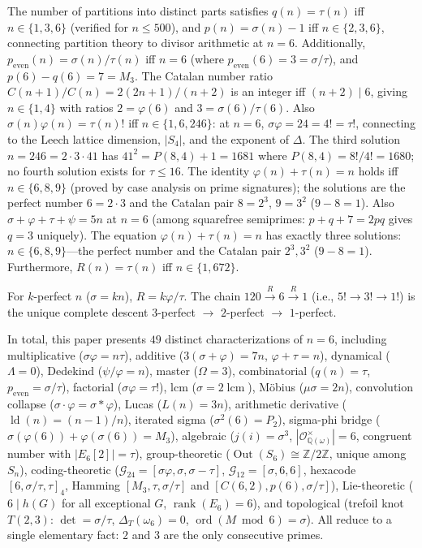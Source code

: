 \documentclass[11pt]{amsart}
\theoremstyle{remark}
\begin{document}
The number of partitions into distinct parts satisfies
$q(n) = \tau(n)$ iff $n \in \{1,3,6\}$ (verified for $n \leq 500$),
and $p(n) = \sigma(n) - 1$ iff $n \in \{2,3,6\}$,
connecting partition theory to divisor arithmetic at $n=6$.
Additionally, $p_{\text{even}}(n) = \sigma(n)/\tau(n)$ iff $n = 6$
(where $p_{\text{even}}(6) = 3 = \sigma/\tau$),
and $p(6) - q(6) = 7 = M_3$.
The Catalan number ratio $C(n+1)/C(n) = 2(2n+1)/(n+2)$
is an integer iff $(n+2) \mid 6$, giving $n \in \{1,4\}$
with ratios $2 = \varphi(6)$ and $3 = \sigma(6)/\tau(6)$.
Also $\sigma(n)\varphi(n) = \tau(n)!$ iff $n \in \{1, 6, 246\}$:
at $n=6$, $\sigma\varphi = 24 = 4! = \tau!$, connecting to the
Leech lattice dimension, $|S_4|$, and the exponent of $\Delta$.
The third solution $n = 246 = 2 \cdot 3 \cdot 41$
has $41^2 = P(8,4) + 1 = 1681$ where $P(8,4) = 8!/4! = 1680$;
no fourth solution exists for $\tau \leq 16$.
The identity $\varphi(n) + \tau(n) = n$ holds iff $n \in \{6, 8, 9\}$
(proved by case analysis on prime signatures);
the solutions are the perfect number $6 = 2 \cdot 3$ and
the Catalan pair $8 = 2^3$, $9 = 3^2$ ($9 - 8 = 1$).
Also $\sigma + \varphi + \tau + \psi = 5n$ at $n = 6$
(among squarefree semiprimes: $p + q + 7 = 2pq$ gives
$q = 3$ uniquely).
The equation $\varphi(n) + \tau(n) = n$ has exactly three solutions:
$n \in \{6, 8, 9\}$---the perfect number and the Catalan pair
$2^3, 3^2$ ($9 - 8 = 1$).
Furthermore, $R(n) = \tau(n)$ iff $n \in \{1, 672\}$.

For $k$-perfect $n$ ($\sigma = kn$), $R = k\varphi/\tau$.
The chain $120 \xrightarrow{R} 6 \xrightarrow{R} 1$
(i.e., $5! \to 3! \to 1!$) is the unique complete descent
$3$-perfect $\to$ $2$-perfect $\to$ $1$-perfect.

In total, this paper presents $49$ distinct characterizations of $n = 6$,
including multiplicative ($\sigma\varphi = n\tau$),
additive ($3(\sigma+\varphi) = 7n$, $\varphi + \tau = n$),
dynamical ($\Lambda = 0$), Dedekind ($\psi/\varphi = n$),
master ($\Omega = 3$), combinatorial ($q(n) = \tau$, $p_{\text{even}} = \sigma/\tau$),
factorial ($\sigma\varphi = \tau!$),
lcm ($\sigma = 2\operatorname{lcm}$), M\"obius ($\mu\sigma = 2n$),
convolution collapse ($\sigma \cdot \varphi = \sigma * \varphi$),
Lucas ($L(n) = 3n$),
arithmetic derivative ($\operatorname{ld}(n) = (n-1)/n$),
iterated sigma ($\sigma^2(6) = P_2$),
sigma-phi bridge ($\sigma(\varphi(6)) + \varphi(\sigma(6)) = M_3$),
algebraic ($j(i) = \sigma^3$, $|\mathcal{O}_{\mathbb{Q}(\omega)}^\times| = 6$,
congruent number with $|E_6[2]| = \tau$),
group-theoretic ($\operatorname{Out}(S_6) \cong \mathbb{Z}/2\mathbb{Z}$, unique among $S_n$),
coding-theoretic ($\mathcal{G}_{24} = [\sigma\varphi, \sigma, \sigma-\tau]$,
$\mathcal{G}_{12} = [\sigma, 6, 6]$,
hexacode $[6, \sigma/\tau, \tau]_4$,
Hamming $[M_3, \tau, \sigma/\tau]$ and $[C(6{,}2), p(6), \sigma/\tau]$),
Lie-theoretic ($6 \mid h(G)$ for all exceptional $G$, $\operatorname{rank}(E_6) = 6$),
and topological (trefoil knot $T(2,3)$: $\det = \sigma/\tau$,
$\Delta_T(\omega_6) = 0$, $\operatorname{ord}(M \bmod 6) = \sigma$).
All reduce to a single elementary fact:
$2$ and $3$ are the only consecutive primes.
\end{document}
